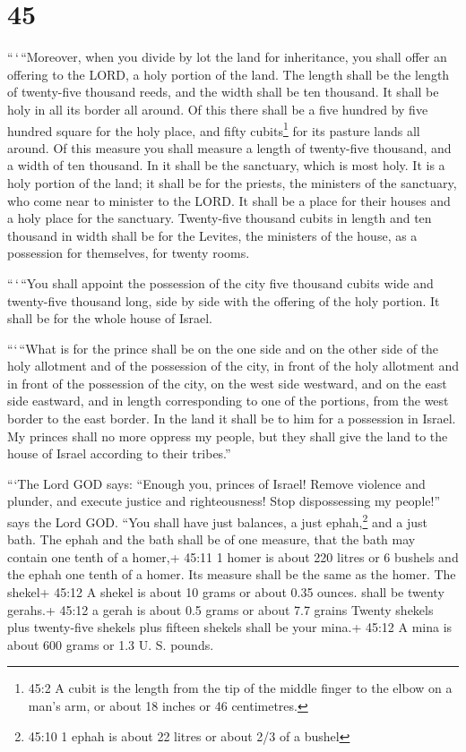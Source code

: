 \hypertarget{section-43}{%
\section{45}\label{section-43}}

 ``\,`\,``Moreover, when you divide by lot the land for
inheritance, you shall offer an offering to the LORD, a holy portion of
the land. The length shall be the length of twenty-five thousand reeds,
and the width shall be ten thousand. It shall be holy in all its border
all around.  Of this there shall be a five hundred by five
hundred square for the holy place, and fifty cubits\footnote{45:2 A
  cubit is the length from the tip of the middle finger to the elbow on
  a man's arm, or about 18 inches or 46 centimetres.} for its pasture
lands all around.  Of this measure you shall measure a
length of twenty-five thousand, and a width of ten thousand. In it shall
be the sanctuary, which is most holy.  It is a holy portion
of the land; it shall be for the priests, the ministers of the
sanctuary, who come near to minister to the LORD. It shall be a place
for their houses and a holy place for the sanctuary. 
Twenty-five thousand cubits in length and ten thousand in width shall be
for the Levites, the ministers of the house, as a possession for
themselves, for twenty rooms.

 ``\,`\,``You shall appoint the possession of the city five
thousand cubits wide and twenty-five thousand long, side by side with
the offering of the holy portion. It shall be for the whole house of
Israel.

 ```\,``What is for the prince shall be on the one side and
on the other side of the holy allotment and of the possession of the
city, in front of the holy allotment and in front of the possession of
the city, on the west side westward, and on the east side eastward, and
in length corresponding to one of the portions, from the west border to
the east border.  In the land it shall be to him for a
possession in Israel. My princes shall no more oppress my people, but
they shall give the land to the house of Israel according to their
tribes.''

 ```The Lord GOD says: ``Enough you, princes of Israel!
Remove violence and plunder, and execute justice and righteousness! Stop
dispossessing my people!'' says the Lord GOD.  ``You shall
have just balances, a just ephah,\footnote{45:10 1 ephah is about 22
  litres or about 2/3 of a bushel} and a just bath.  The
ephah and the bath shall be of one measure, that the bath may contain
one tenth of a homer,+ 45:11 1 homer is about 220 litres or 6 bushels
and the ephah one tenth of a homer. Its measure shall be the same as the
homer.  The shekel+ 45:12 A shekel is about 10 grams or
about 0.35 ounces. shall be twenty gerahs.+ 45:12 a gerah is about 0.5
grams or about 7.7 grains Twenty shekels plus twenty-five shekels plus
fifteen shekels shall be your mina.+ 45:12 A mina is about 600 grams or
1.3 U. S. pounds.

